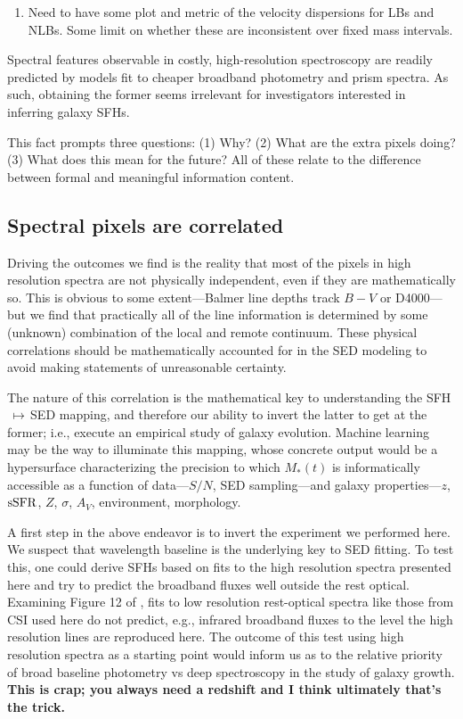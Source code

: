 \documentclass[a4paper,fleqn,usenatbib]{mnras}
\newcommand{\Mstel}{M_\ast}
\newcommand{\bfr}{\bf\color{red}}
\newcommand{\ssfr}{{\rm sSFR}}
\newcommand{\benum}{\begin{enumerate}}
\newcommand{\eenum}{\end{enumerate}}
\begin{document}
\benum
	\item Need to have some plot and metric of the velocity dispersions for LBs and NLBs. Some
		limit on whether these are inconsistent over fixed mass intervals.
\eenum


Spectral features observable in costly, high-resolution spectroscopy are readily predicted by 
models fit to cheaper broadband photometry and prism spectra. As such, obtaining the former 
seems irrelevant for investigators interested in inferring galaxy SFHs.

This fact prompts three questions: (1) Why? (2) What are the extra pixels doing? (3) What does
this mean for the future? All of these relate to the difference between formal and meaningful 
information content.

\subsection{Spectral pixels are correlated}
\label{sec:pixels}

Driving the outcomes we find is the reality that most of the pixels in high resolution 
spectra are not physically independent, even if they are mathematically so. This is obvious to 
some extent---Balmer line depths track $B-V$ or D4000---but we find that practically all of the 
line information is determined by some (unknown) combination of the local and remote 
continuum. These physical correlations should be mathematically accounted for in the SED 
modeling to avoid making statements of unreasonable certainty.

The nature of this correlation is the mathematical key to understanding the SFH$\,\mapsto\,$SED 
mapping, and therefore our ability to invert the latter to get at the former; i.e., execute an empirical 
study of galaxy evolution. Machine learning may be the way to illuminate this mapping, whose concrete 
output would be a hypersurface characterizing the precision to which $\Mstel(t)$ is informatically 
accessible as a function of data---$S/N$, SED sampling---and galaxy properties---$z$, $\ssfr$, $Z$, 
$\sigma$, $A_{V}$, environment, morphology. 

A first step in the above endeavor is to invert the experiment we performed here. We suspect 
that wavelength baseline is the underlying key to SED fitting. To test this, one could derive
SFHs based on fits to the high resolution spectra presented here and try to predict the broadband
fluxes well outside the rest optical. Examining Figure 12 of \citet{Abramson20}, fits to
low resolution rest-optical spectra like those from CSI used here do not predict, e.g., infrared
broadband fluxes to the level the high resolution lines are reproduced here. The outcome of
this test using high resolution spectra as a starting point would inform us as to the relative
priority of broad baseline photometry vs deep spectroscopy in the study of galaxy growth. 
{\bfr This is crap; you always need a redshift and I think ultimately that's the trick.}
\end{document}
